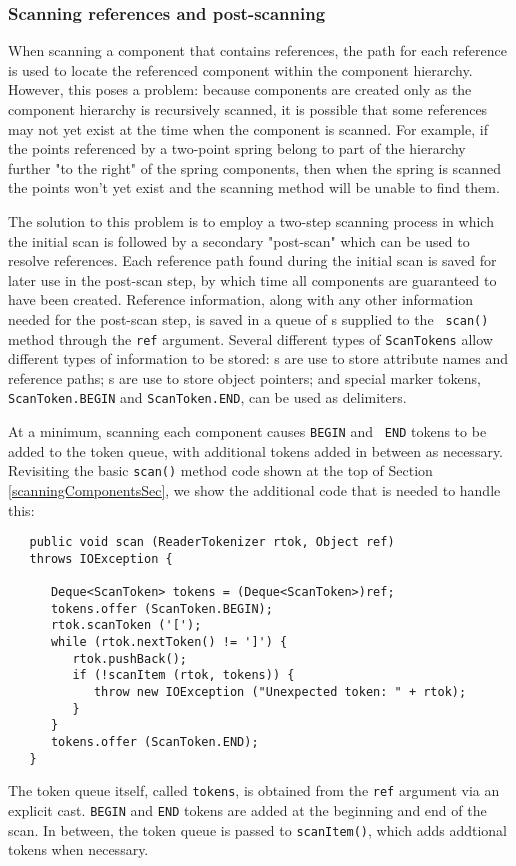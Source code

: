 \documentclass{article}
\begin{document}
\subsubsection{Scanning references and post-scanning}
\label{scanningReferencesSec}

When scanning a component that contains references, the path for each
reference is used to locate the referenced component within
the component hierarchy.
However, this poses a problem: because components are
created only as the component hierarchy is recursively scanned, it is
possible that some references may not yet exist at
the time when the component is scanned. For example, if the points
referenced by a two-point spring belong to part of the hierarchy
further "to the right" of the spring components, then when the
spring is scanned the points won't yet exist and the scanning method
will be unable to find them.

The solution to this problem is to employ a two-step scanning process
in which the initial scan is followed by a secondary "post-scan" which
can be used to resolve references. Each reference path found during
the initial scan is saved for later use in the post-scan step, by
which time all components are guaranteed to have been
created. Reference information, along with any other information
needed for the post-scan step, is saved in a queue of
s supplied to the {\tt
scan()} method through the {\tt ref} argument. Several different types
of {\tt ScanTokens} allow different types of information to be stored:
s are use to store
attribute names and reference paths;
s are use to store object
pointers; and special marker tokens, {\tt ScanToken.BEGIN}
and {\tt ScanToken.END}, can be used as delimiters.

At a minimum, scanning each component causes {\tt BEGIN} and {\tt
END} tokens to be added to the token queue, with additional
tokens added in between as necessary.
Revisiting the basic {\tt scan()} method code
shown at the top of Section \ref{scanningComponentsSec},
we show the additional code that is needed to handle this:
\begin{lstlisting}
   public void scan (ReaderTokenizer rtok, Object ref) 
   throws IOException {

      Deque<ScanToken> tokens = (Deque<ScanToken>)ref;
      tokens.offer (ScanToken.BEGIN);
      rtok.scanToken ('[');
      while (rtok.nextToken() != ']') {
         rtok.pushBack();
         if (!scanItem (rtok, tokens)) {
            throw new IOException ("Unexpected token: " + rtok);
         }
      }
      tokens.offer (ScanToken.END);
   }
\end{lstlisting}
The token queue itself, called {\tt tokens}, is obtained from the
{\tt ref} argument via an explicit cast.
{\tt BEGIN} and {\tt END} tokens are added at the
beginning and end of the scan. In between, the token queue
is passed to {\tt scanItem()}, which adds addtional tokens
when necessary. 
\end{document}
